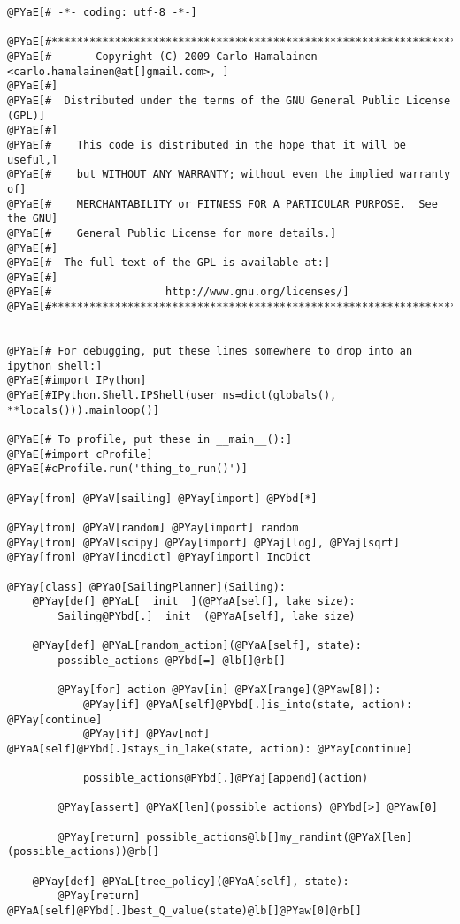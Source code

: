 \begin{Verbatim}[commandchars=@\[\]]
@PYaE[# -*- coding: utf-8 -*-]

@PYaE[#*****************************************************************************]
@PYaE[#       Copyright (C) 2009 Carlo Hamalainen <carlo.hamalainen@at[]gmail.com>, ]
@PYaE[#]
@PYaE[#  Distributed under the terms of the GNU General Public License (GPL)]
@PYaE[#]
@PYaE[#    This code is distributed in the hope that it will be useful,]
@PYaE[#    but WITHOUT ANY WARRANTY; without even the implied warranty of]
@PYaE[#    MERCHANTABILITY or FITNESS FOR A PARTICULAR PURPOSE.  See the GNU]
@PYaE[#    General Public License for more details.]
@PYaE[#]
@PYaE[#  The full text of the GPL is available at:]
@PYaE[#]
@PYaE[#                  http://www.gnu.org/licenses/]
@PYaE[#*****************************************************************************]


@PYaE[# For debugging, put these lines somewhere to drop into an ipython shell:]
@PYaE[#import IPython]
@PYaE[#IPython.Shell.IPShell(user_ns=dict(globals(), **locals())).mainloop()]

@PYaE[# To profile, put these in __main__():]
@PYaE[#import cProfile]
@PYaE[#cProfile.run('thing_to_run()')]

@PYay[from] @PYaV[sailing] @PYay[import] @PYbd[*]

@PYay[from] @PYaV[random] @PYay[import] random
@PYay[from] @PYaV[scipy] @PYay[import] @PYaj[log], @PYaj[sqrt]
@PYay[from] @PYaV[incdict] @PYay[import] IncDict

@PYay[class] @PYaO[SailingPlanner](Sailing):
    @PYay[def] @PYaL[__init__](@PYaA[self], lake_size):
        Sailing@PYbd[.]__init__(@PYaA[self], lake_size)

    @PYay[def] @PYaL[random_action](@PYaA[self], state):
        possible_actions @PYbd[=] @lb[]@rb[]

        @PYay[for] action @PYav[in] @PYaX[range](@PYaw[8]):
            @PYay[if] @PYaA[self]@PYbd[.]is_into(state, action): @PYay[continue]
            @PYay[if] @PYav[not] @PYaA[self]@PYbd[.]stays_in_lake(state, action): @PYay[continue]

            possible_actions@PYbd[.]@PYaj[append](action)

        @PYay[assert] @PYaX[len](possible_actions) @PYbd[>] @PYaw[0]

        @PYay[return] possible_actions@lb[]my_randint(@PYaX[len](possible_actions))@rb[]

    @PYay[def] @PYaL[tree_policy](@PYaA[self], state):
        @PYay[return] @PYaA[self]@PYbd[.]best_Q_value(state)@lb[]@PYaw[0]@rb[]


\end{Verbatim}
